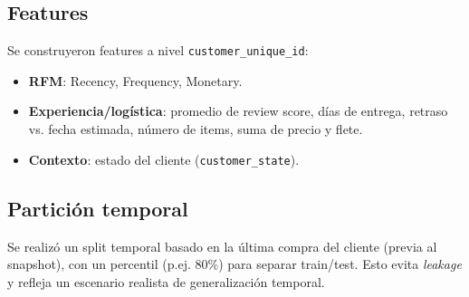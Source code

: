 \subsection*{Features}
Se construyeron features a nivel \texttt{customer\_unique\_id}:
\begin{itemize}
  \item \textbf{RFM}: Recency, Frequency, Monetary.
  \item \textbf{Experiencia/logística}: promedio de review score, días de entrega, retraso vs. fecha estimada, número de items, suma de precio y flete.
  \item \textbf{Contexto}: estado del cliente (\texttt{customer\_state}).
\end{itemize}

\subsection*{Partición temporal}
Se realizó un split temporal basado en la última compra del cliente (previa al snapshot), con un percentil (p.ej. 80\%) para separar train/test. Esto evita \textit{leakage} y refleja un escenario realista de generalización temporal.
